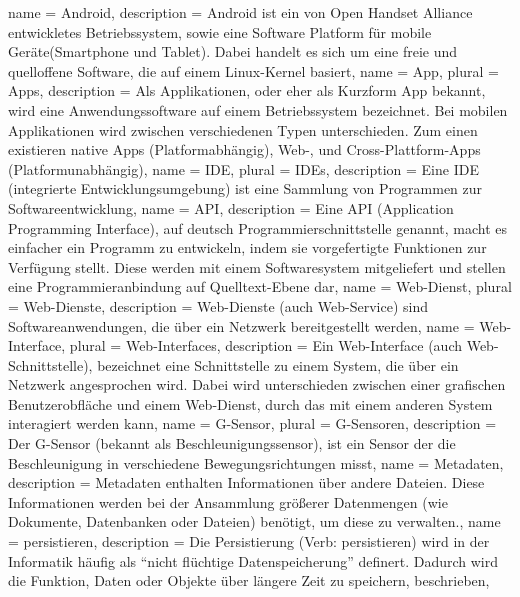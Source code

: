 \newpage
\printglossaries
{}
{
  name = Android,
  description = {Android ist ein von Open Handset Alliance entwickletes Betriebssystem, sowie eine Software Platform für mobile Geräte(\gls{Smartphone} und \gls{Tablet}). Dabei handelt es sich um eine freie und quelloffene Software, die auf einem Linux-Kernel basiert},
}
{
  name = App,
  plural = Apps,
  description = {Als Applikationen, oder eher als Kurzform App bekannt, wird eine Anwendungssoftware auf einem Betriebssystem bezeichnet. Bei mobilen Applikationen wird zwischen verschiedenen Typen unterschieden. Zum einen existieren native Apps (Platformabhängig), Web-, und Cross-Plattform-Apps (Platformunabhängig)},
}
{
	name = IDE,
	plural = IDEs,
	description = {Eine IDE (integrierte Entwicklungsumgebung) ist eine Sammlung von Programmen zur Softwareentwicklung},
}
{
  name = API,
  description = {Eine API (Application Programming Interface), auf deutsch Programmierschnittstelle genannt, macht es einfacher ein Programm zu entwickeln, indem sie vorgefertigte Funktionen zur Verfügung stellt. Diese werden mit einem Softwaresystem mitgeliefert und stellen eine Programmieranbindung auf Quelltext-Ebene dar},
}
{
  name = Web-Dienst,
  plural = Web-Dienste,
  description = {Web-Dienste (auch Web-Service) sind Softwareanwendungen, die über ein Netzwerk bereitgestellt werden},
}
{
  name = Web-Interface,
  plural = Web-Interfaces,
  description = {Ein Web-Interface (auch Web-Schnittstelle), bezeichnet eine Schnittstelle zu einem System, die über ein Netzwerk angesprochen wird. Dabei wird unterschieden zwischen einer grafischen Benutzerobfläche und einem \gls{Web-Dienst}, durch das mit einem anderen System interagiert werden kann},
}
{
  name = G-Sensor,
  plural = G-Sensoren,
  description = {Der G-Sensor (bekannt als Beschleunigungssensor), ist ein Sensor der die Beschleunigung in verschiedene Bewegungsrichtungen misst},
}
{
  name = Metadaten,
  description = {Metadaten enthalten Informationen über andere Dateien. Diese Informationen werden bei der Ansammlung größerer Datenmengen (wie Dokumente, Datenbanken oder Dateien) benötigt, um diese zu verwalten.},
}
{
  name = persistieren,
  description = {Die Persistierung (Verb: persistieren) wird in der Informatik häufig als ``nicht flüchtige Datenspeicherung'' definert. Dadurch wird die Funktion, Daten oder Objekte über längere Zeit zu speichern, beschrieben},
}
